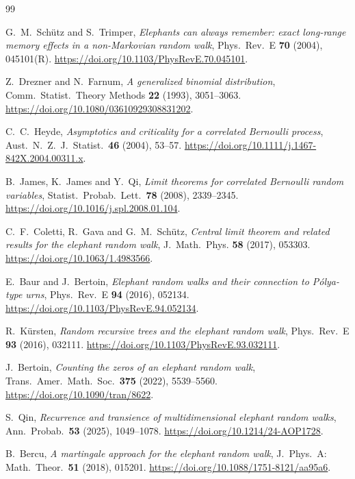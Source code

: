 \begin{thebibliography}{99}\small\setlength{\baselineskip}{11pt}\setlength{\itemsep}{0pt}\setlength{\parsep}{0pt}

G.~M.~Sch\"utz and S.~Trimper, \emph{Elephants can always remember: exact
long-range memory effects in a non-Markovian random walk}, Phys.\ Rev.\ E
\textbf{70} (2004), 045101(R).
\url{https://doi.org/10.1103/PhysRevE.70.045101}.

Z.~Drezner and N.~Farnum, \emph{A generalized binomial distribution},
Comm.\ Statist.\ Theory Methods \textbf{22} (1993), 3051--3063.
\url{https://doi.org/10.1080/03610929308831202}.

C.~C.~Heyde, \emph{Asymptotics and criticality for a correlated Bernoulli
process}, Aust.\ N.\ Z.\ J.\ Statist.\ \textbf{46} (2004), 53--57.
\url{https://doi.org/10.1111/j.1467-842X.2004.00311.x}.

B.~James, K.~James and Y.~Qi, \emph{Limit theorems for correlated Bernoulli
random variables}, Statist.\ Probab.\ Lett.\ \textbf{78} (2008), 2339--2345.
\url{https://doi.org/10.1016/j.spl.2008.01.104}.

C.~F.~Coletti, R.~Gava and G.~M.~Sch\"utz, \emph{Central limit theorem and
related results for the elephant random walk}, J.~Math.~Phys. \textbf{58}
(2017), 053303.
\url{https://doi.org/10.1063/1.4983566}.

E.~Baur and J.~Bertoin, \emph{Elephant random walks and their
connection to P\'olya-type urns}, Phys.\ Rev.\ E \textbf{94}
(2016), 052134. \url{https://doi.org/10.1103/PhysRevE.94.052134}.

R.~K\"ursten, \emph{Random recursive trees and the elephant random walk},
Phys.\ Rev.\ E \textbf{93} (2016), 032111.
\url{https://doi.org/10.1103/PhysRevE.93.032111}.

J.~Bertoin, \emph{Counting the zeros of an elephant random walk},
Trans.\ Amer.\ Math.\ Soc.\ \textbf{375} (2022), 5539--5560.
\url{https://doi.org/10.1090/tran/8622}.

S.~Qin, \emph{Recurrence and transience of multidimensional elephant
random walks}, Ann.\ Probab.\ \textbf{53} (2025), 1049--1078.
\url{https://doi.org/10.1214/24-AOP1728}.

B.~Bercu, \emph{A martingale approach for the elephant random walk},
J.\ Phys.\ A: Math.\ Theor.\ \textbf{51} (2018), 015201.
\url{https://doi.org/10.1088/1751-8121/aa95a6}.


\end{thebibliography}

